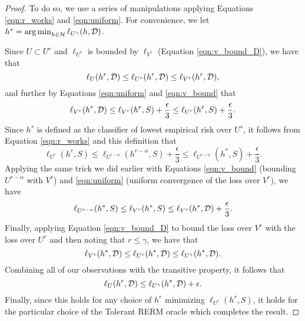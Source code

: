 \begin{proof}
To do so, we use a series of manipulations applying Equations \ref{eqn:r_works} and \ref{eqn:uniform}. For convenience, we let $h^* = \operatorname*{arg\,min}_{h \in \mathcal H} \ell_{U^\gamma}(h, \mathcal D)$. 

Since $U \subset U^r$ and $\ell_{U^r}$ is bounded by $\ell_{V^r}$ (Equation \ref{eqn:v_bound_D}), we have that $$\ell_U(h^r, \mathcal D) \leq \ell_{U^r}(h^r, \mathcal D) \leq \ell_{V^r}(h^r, \mathcal D),$$ 
and further by Equations \ref{eqn:uniform} and \ref{eqn:v_bound} that
$$\ell_{V^r}(h^r, \mathcal D) \leq \ell_{V^r}(h^r, S) + \frac{\epsilon}{3} \leq \ell_{U^r}(h^r, S) + \frac{\epsilon}{3}.$$
Since $h^s$ is defined as the classifier of lowest empirical risk over $U^s$, it follows from Equation \ref{eqn:r_works} and this definition that 
$$\ell_{U^r}(h^r, S) \leq \ell_{U^{r-\alpha}}(h^{r-\alpha}, S) + \frac{\epsilon}{3} \leq \ell_{U^{r-\alpha}}(h^*, S) + \frac{\epsilon}{3}.$$
Applying the same trick we did earlier with Equations \ref{eqn:v_bound} (bounding $U^{r-\alpha}$ with $V^r$) and \ref{eqn:uniform} (uniform convergence of the loss over $V^r$), we have $$\ell_{U^{r-\alpha}}(h^*, S) \leq \ell_{V^r}(h^*, S) \leq \ell_{V^r}(h^*, \mathcal D) + \frac{\epsilon}{3}.$$ Finally, applying Equation \ref{eqn:v_bound_D} to bound the loss over $V^r$ with the loss over $U^r$ and then noting that $r \leq \gamma$, we have that $$\ell_{V^r}(h^*, \mathcal D) \leq \ell_{U^r}(h^*, \mathcal D) \leq \ell_{U^\gamma}(h^*, \mathcal D).$$ Combining all of our observations with the transitive property, it follows that $$\ell_U(h^r, \mathcal D) \leq \ell_{U^\gamma}(h^*, \mathcal D) + \epsilon.$$ Finally, since this holds for any choice of $h^r$ minimizing $\ell_{U^r}(h^r,S)$, it holds for the particular choice of the Tolerant RERM oracle which completes the result.
\end{proof}





%
%
%
%
%
%
%